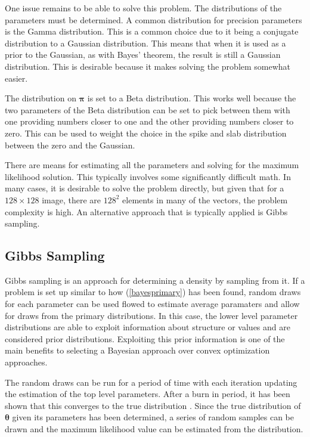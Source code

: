 \documentclass{IEEEtran}
\begin{document}
One issue remains to be able to solve this problem.  The distributions of the
parameters must be determined.  A common distribution for precision
parameters is the Gamma distribution.  This is a common choice due to
it being a conjugate distribution to a Gaussian distribution.  This
means that when it is used as a prior to the Gaussian, as with Bayes'
theorem, the result is still a Gaussian distribution.  This is
desirable because it makes solving the problem somewhat easier. 

The distribution on $\mathbf{\pi}$ is set to a Beta distribution.  This
works well because the two parameters of the Beta distribution can be
set to pick between them with one providing numbers closer to one and
the other providing numbers closer to zero.  This can be used to
weight the choice in the spike and slab distribution between the zero
and the Gaussian.  

There are means for estimating all the parameters and solving for the
maximum likelihood solution.  This typically involves some
significantly difficult math.  In many cases, it is desirable to solve
the problem directly, but given that for a $128\times128$ image, there
are $128^2$ elements in many of the vectors, the problem complexity is
high.  An alternative approach that is typically applied is Gibbs
sampling.

\subsection{Gibbs Sampling}

Gibbs sampling is an approach for determining a density by sampling
from it.  If a problem is set up similar to how (\ref{bayesprimary})
has been found, random draws for each parameter can be used
flowed to estimate average paramaters and allow for draws from the primary distributions.  In this
case, the lower level parameter distributions are able to exploit information
about structure or values and are considered prior distributions.
Exploiting this prior information is one of the main benefits to selecting a Bayesian approach over
convex optimization approaches.  

The random draws can be run for a period of time with each iteration
updating the estimation of the top level parameters. After a burn in
period, it has been shown that this
converges to the true distribution \cite{Mackay03}.  Since the true
distribution of $\mathbf{\theta}$ given its parameters has been determined, a series of random samples can be drawn
and the maximum likelihood value can be estimated from the
distribution.
\end{document}
